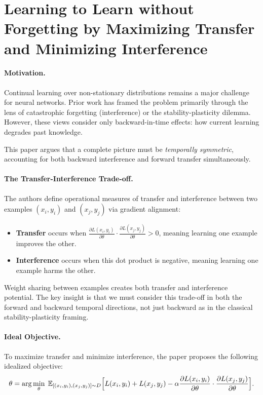 \documentclass[12pt]{article}
\begin{document}
\psetheader %

\section*{Learning to Learn without Forgetting by Maximizing Transfer and Minimizing Interference}

\paragraph{Motivation.}
Continual learning over non-stationary distributions remains a major challenge
for neural networks. Prior work has framed the problem primarily through the
lens of catastrophic forgetting (interference) or the stability-plasticity
dilemma. However, these views consider only backward-in-time effects: how
current learning degrades past knowledge.

This paper argues that a complete picture must be \emph{temporally symmetric},
accounting for both backward interference and forward transfer simultaneously.

\paragraph{The Transfer-Interference Trade-off.}
The authors define operational measures of transfer and interference between
two examples $(x_i, y_i)$ and $(x_j, y_j)$ via gradient alignment:

\begin{itemize}
		\item \textbf{Transfer} occurs when
				$\frac{\partial L(x_i, y_i)}{\partial \theta} \cdot
				\frac{\partial L(x_j, y_j)}{\partial \theta} > 0$,
				meaning learning one example improves the other.
		\item \textbf{Interference} occurs when this dot product is negative,
				meaning learning one example harms the other.
\end{itemize}

Weight sharing between examples creates both transfer and interference potential.
The key insight is that we must consider this trade-off in both the forward and
backward temporal directions, not just backward as in the classical
stability-plasticity framing.

\paragraph{Ideal Objective.}
To maximize transfer and minimize interference, the paper proposes the following
idealized objective:
\[
		\theta = \arg\min_{\theta} \;
		\mathbb{E}_{[(x_i, y_i),(x_j, y_j)] \sim D}
		\Bigl[ L(x_i, y_i) + L(x_j, y_j)
    - \alpha \frac{\partial L(x_i, y_i)}{\partial \theta} \cdot
		\frac{\partial L(x_j, y_j)}{\partial \theta} \Bigr].
\]
\end{document}
